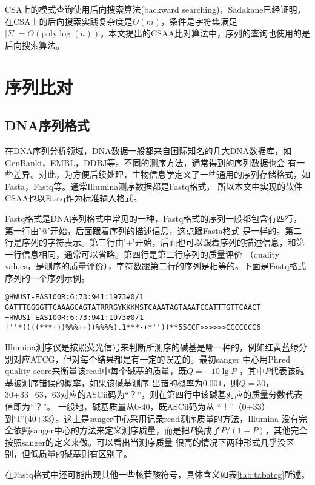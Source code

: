 CSA上的模式查询使用后向搜索算法(backward searching)，Sadakane已经证明，在CSA上的后向搜索实践复杂度是$O(m)$，条件是字符集满足
$|\Sigma|=O(\text{poly} \log(n))$\cite{sadakane2002succinct}。本文提出的CSAA比对算法中，序列的查询也使用的是后向搜索算法。

\section{序列比对}

\subsection{DNA序列格式}

在DNA序列分析领域，DNA数据一般都来自国际知名的几大DNA数据库，如GenBanki，EMBL，DDBJ等。不同的测序方法，通常得到的序列数据也会
有一些差异。对此，为方便后续处理，生物信息学定义了一些通用的序列存储格式，如Fasta，Fastq等。通常Illumina测序数据都是Fastq格式，
所以本文中实现的软件CSAA也以Fastq作为标准输入格式。

Fastq格式是DNA序列格式中常见的一种，Fastq格式的序列一般都包含有四行，第一行由'@'开始，后面跟着序列的描述信息，这点跟Fasta格式
是一样的。第二行是序列的字符表示。第三行由'+'开始，后面也可以跟着序列的描述信息，和第一行信息相同，通常可以省略。第四行是第二行序列的质量评价
（quality values，是测序的质量评价），字符数跟第二行的序列是相等的。下面是Fastq格式序列的一个序列示例。

\begin{verbatim}
@HWUSI-EAS100R:6:73:941:1973#0/1
GATTTGGGGTTCAAAGCAGTATRRRGYKKKMSTCAAATAGTAAATCCATTTGTTCAACT
+HWUSI-EAS100R:6:73:941:1973#0/1
!''*((((***+))%%%++)(%%%%).1***-+*''))**55CCF>>>>>>CCCCCCC6
\end{verbatim}

Illumina测序仪是按照荧光信号来判断所测序的碱基是哪一种的，例如红黄蓝绿分别对应ATCG，但对每个结果都是有一定的误差的。最初sanger
中心用Phred quality score来衡量该read中每个碱基的质量，既$Q=-10\lg P$ ，其中$P$代表该碱基被测序错误的概率，如果该碱基测序
出错的概率为$0.001$，则$Q=30$，30+33=63，63对应的ASCii码为“？”，则在第四行中该碱基对应的质量分数代表值即为“？”。
一般地，碱基质量从0-40，既ASCii码为从 “！”（0+33）到“I”(40+33）。这上是sanger中心采用记录read测序质量的方法，Illumina
没有完全依照sanger中心的方法来定义测序质量，而是把$P$换成了$P/(1-P)$，其他完全按照sanger的定义来做。可以看出当测序质量
很高的情况下两种形式几乎没区别，但低质量的碱基则有区别了。

在Fastq格式中还可能出现其他一些核苷酸符号，具体含义如表\ref{tab:tabatcg}所述。

